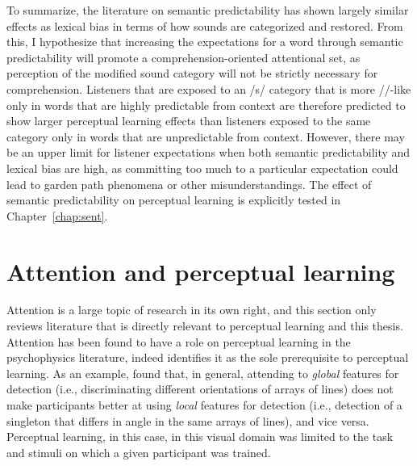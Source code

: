 To summarize, the literature on semantic predictability has shown largely similar effects as lexical bias in terms of how sounds are categorized and restored.  
From this, I hypothesize that increasing the expectations for a word through semantic predictability will promote a comprehension-oriented attentional set, as perception of the modified sound category will not be strictly necessary for comprehension.
Listeners that are exposed to an /s/ category that is more /\textesh/-like only in words that are highly predictable from context are therefore predicted to show larger perceptual learning effects than listeners exposed to the same category only in words that are unpredictable from context.
However, there may be an upper limit for listener expectations when both semantic predictability and lexical bias are high, as committing too much to a particular expectation could lead to garden path phenomena \citep{Levy2008} or other misunderstandings.
The effect of semantic predictability on perceptual learning is explicitly tested in Chapter~\ref{chap:sent}.

\section{Attention and perceptual learning}
\label{sec:attention}

Attention is a large topic of research in its own right, and this section only reviews literature that is directly relevant to perceptual learning and this thesis.
Attention has been found to have a role on perceptual learning in the psychophysics literature, indeed \citet{Gibson1953} identifies it as the sole prerequisite to perceptual learning.
As an example, \citet{Ahissar1993} found that, in general, attending to \emph{global} features for detection (i.e., discriminating different orientations of arrays of lines) does not make participants better at using \emph{local} features for detection (i.e., detection of a singleton that differs in angle in the same arrays of lines), and vice versa.  Perceptual learning, in this case, in this visual domain was limited to the task and stimuli on which a given participant was trained.  

